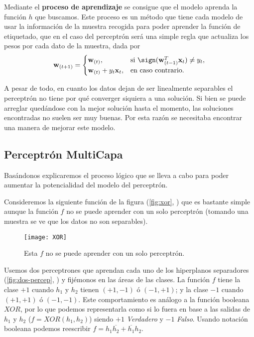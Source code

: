 Mediante el \textbf{proceso de aprendizaje} se consigue que el modelo aprenda la función $h$ que buscamos. Este proceso es un método que tiene cada modelo de usar la información de la muestra recogida para poder aprender la función de etiquetado, que en el caso del perceptrón será una simple regla que actualiza los pesos por cada dato de la muestra, dada por
\begin{equation*}
  \textbf{w}_{(t + 1)} =
  \begin{cases}
    \textbf{w}_{(t)}, & \text{si } \sign(\textbf{w}^T_{(t-1)} \textbf{x}_t) \neq y_t, \\
    \textbf{w}_{(t)} + y_t \textbf{x}_t, & \text{en caso contrario.}
  \end{cases}
  \label{eq:percep-rule}
\end{equation*}

A pesar de todo, en cuanto los datos dejan de ser linealmente separables el perceptrón no tiene por qué converger siquiera a una solución. Si bien se puede arreglar quedándose con la mejor solución hasta el momento, las soluciones encontradas no suelen ser muy buenas. Por esta razón se necesitaba encontrar una manera de mejorar este modelo.

\subsection{Perceptrón MultiCapa}

Basándonos \cite{abu2012learning} explicaremos el proceso lógico que se lleva a cabo para poder aumentar la potencialidad del modelo del perceptrón.

Consideremos la siguiente función de la figura (\autoref{fig:xor}, \cite{abu2012learning}) que es bastante simple aunque la función $f$ no se puede aprender con un solo perceptrón (tomando una muestra se ve que los datos no son separables).

\begin{figure}[htpb]
  \centering
  \texttt{[image: XOR]}
  \caption{Esta $f$ no se puede aprender con un solo perceptrón.}
  \label{fig:xor}
\end{figure}

Usemos dos perceptrones que aprendan cada uno de los hiperplanos separadores (\autoref{fig:dos-percep}, \cite{abu2012learning}) y fijémonos en las áreas de las clases. La función $f$ tiene la clase $+1$ cuando $h_1$ y $h_2$ tienen $(+1, -1)$ ó $(-1, +1)$; y la clase $-1$ cuando $(+1, +1)$ ó $(-1, -1)$. Este comportamiento es análogo a la función booleana $XOR$, por lo que podemos representarla como si lo fuera en base a las salidas de $h_1$ y $h_2$ ($f = XOR(h_1, h_2)$) siendo $+1$ \emph{Verdadero} y $-1$ \emph{Falso}. Usando notación booleana podemos reescribir $f = h_1\overline{h_2} + \overline{h_1}h_2$.

